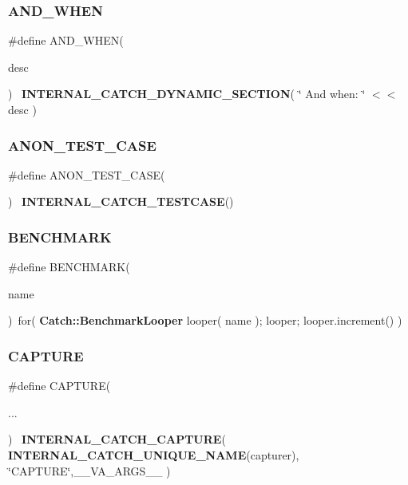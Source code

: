 \subsubsection{AND\_WHEN}
{\footnotesize\ttfamily \#define A\+N\+D\+\_\+\+W\+H\+EN(\begin{DoxyParamCaption}\item[{}]{desc }\end{DoxyParamCaption})~\textbf{ I\+N\+T\+E\+R\+N\+A\+L\+\_\+\+C\+A\+T\+C\+H\+\_\+\+D\+Y\+N\+A\+M\+I\+C\+\_\+\+S\+E\+C\+T\+I\+ON}( \char`\"{} And when\+: \char`\"{} $<$$<$ desc )}

\mbox{\label{catch_8hpp_ab41cb63be394c30d48fa579bf8352f18}} 
\subsubsection{ANON\_TEST\_CASE}
{\footnotesize\ttfamily \#define A\+N\+O\+N\+\_\+\+T\+E\+S\+T\+\_\+\+C\+A\+SE(\begin{DoxyParamCaption}{ }\end{DoxyParamCaption})~\textbf{ I\+N\+T\+E\+R\+N\+A\+L\+\_\+\+C\+A\+T\+C\+H\+\_\+\+T\+E\+S\+T\+C\+A\+SE}()}

\mbox{\label{catch_8hpp_aaba0eec6ef0736ca2b022a98a7c855e4}} 
\subsubsection{BENCHMARK}
{\footnotesize\ttfamily \#define B\+E\+N\+C\+H\+M\+A\+RK(\begin{DoxyParamCaption}\item[{}]{name }\end{DoxyParamCaption})~for( \textbf{ Catch\+::\+Benchmark\+Looper} looper( name ); looper; looper.\+increment() )}

\mbox{\label{catch_8hpp_aaf9fe43c53965ff8d94bbd522fd1fd7a}} 
\subsubsection{CAPTURE}
{\footnotesize\ttfamily \#define C\+A\+P\+T\+U\+RE(\begin{DoxyParamCaption}\item[{}]{... }\end{DoxyParamCaption})~\textbf{ I\+N\+T\+E\+R\+N\+A\+L\+\_\+\+C\+A\+T\+C\+H\+\_\+\+C\+A\+P\+T\+U\+RE}( \textbf{ I\+N\+T\+E\+R\+N\+A\+L\+\_\+\+C\+A\+T\+C\+H\+\_\+\+U\+N\+I\+Q\+U\+E\+\_\+\+N\+A\+ME}(capturer), \char`\"{}C\+A\+P\+T\+U\+RE\char`\"{},\+\_\+\+\_\+\+V\+A\+\_\+\+A\+R\+G\+S\+\_\+\+\_\+ )}


